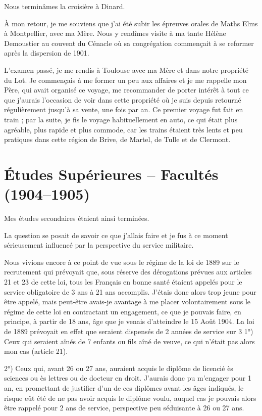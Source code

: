 \documentclass[11pt,a4paper]{report}
\begin{document}
Nous terminâmes la croisière à Dinard.

À mon retour, je me souviens que j'ai été subir les épreuves orales de Maths Elms à Montpellier, avec ma Mère. Nous y rendîmes visite à ma tante Hélène Demoustier au couvent du Cénacle où sa congrégation commençait à se reformer après la dispersion de 1901.

L'examen passé, je me rendis à Toulouse avec ma Mère et dans notre propriété du Lot. Je commençais à me former un peu aux affaires et je me rappelle mon Père, qui avait organisé ce voyage, me recommander de porter intérêt à tout ce que j'aurais l'occasion de voir dans cette propriété où je suis depuis retourné régulièrement jusqu'à sa vente, une fois par an. Ce premier voyage fut fait en train ; par la suite, je fis le voyage habituellement en auto, ce qui était plus agréable, plus rapide et plus commode, car les trains étaient très lents et peu pratiques dans cette région de Brive, de Martel, de Tulle et de Clermont.

\chapter{Études Supérieures -- Facultés (1904--1905)}

Mes études secondaires étaient ainsi terminées.

La question se posait de savoir ce que j'allais faire et je fus à ce moment sérieusement influencé par la perspective du service militaire.

Nous vivions encore à ce point de vue sous le régime de la loi de 1889 sur le recrutement qui prévoyait que, sous réserve des dérogations prévues aux articles 21 et 23 de cette loi, tous les Français en bonne santé étaient appelés pour le service obligatoire de 3 ans à 21 ans accomplis. J'étais donc alors trop jeune pour être appelé, mais peut-être avais-je avantage à me placer volontairement sous le régime de cette loi en contractant un engagement, ce que je pouvais faire, en principe, à partir de 18 ans, âge que je venais d'atteindre le 15 Août 1904. La loi de 1889 prévoyait en effet que seraient dispensés de 2 années de service sur 3 1°) Ceux qui seraient aînés de 7 enfants ou fils aîné de veuve, ce qui n'était pas alors mon cas (article 21).

2°) Ceux qui, avant 26 ou 27 ans, auraient acquis le diplôme de licencié ès sciences ou ès lettres ou de docteur en droit. J'aurais donc pu m'engager pour 1 an, en promettant de justifier d'un de ces diplômes avant les âges indiqués, le risque eût été de ne pas avoir acquis le diplôme voulu, auquel cas je pouvais alors être rappelé pour 2 ans de service, perspective peu séduisante à 26 ou 27 ans.
\end{document}
